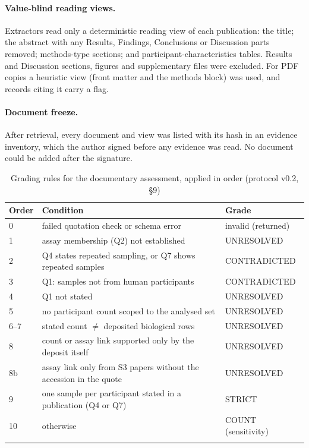 \documentclass[sn-basic]{sn-jnl}
\begin{document}
\paragraph{Value-blind reading views.} Extractors read only a deterministic reading view of each publication: the
title; the abstract with any Results, Findings, Conclusions or Discussion parts removed; methods-type sections; and
participant-characteristics tables. Results and Discussion sections, figures and supplementary files were excluded.
For PDF copies a heuristic view (front matter and the methods block) was used, and records citing it carry a flag.

\paragraph{Document freeze.} After retrieval, every document and view was listed with its hash in an evidence
inventory, which the author signed before any evidence was read. No document could be added after the signature.

\begin{table}[!ht]
\caption{Grading rules for the documentary assessment, applied in order (protocol v0.2, \S9)}\label{tab:S2}
\begin{tabular*}{\textwidth}{@{\extracolsep\fill}lp{}l}
\toprule
Order & Condition & Grade \\
\midrule
0 & failed quotation check or schema error & invalid (returned) \\
1 & assay membership (Q2) not established & UNRESOLVED \\
2 & Q4 states repeated sampling, or Q7 shows repeated samples & CONTRADICTED \\
3 & Q1: samples not from human participants & CONTRADICTED \\
4 & Q1 not stated & UNRESOLVED \\
5 & no participant count scoped to the analysed set & UNRESOLVED \\
6--7 & stated count $\neq$ deposited biological rows & UNRESOLVED \\
8 & count or assay link supported only by the deposit itself & UNRESOLVED \\
8b & assay link only from S3 papers without the accession in the quote & UNRESOLVED \\
9 & one sample per participant stated in a publication (Q4 or Q7) & STRICT \\
10 & otherwise & COUNT (sensitivity) \\
\botrule
\end{tabular*}
\end{table}
\end{document}
